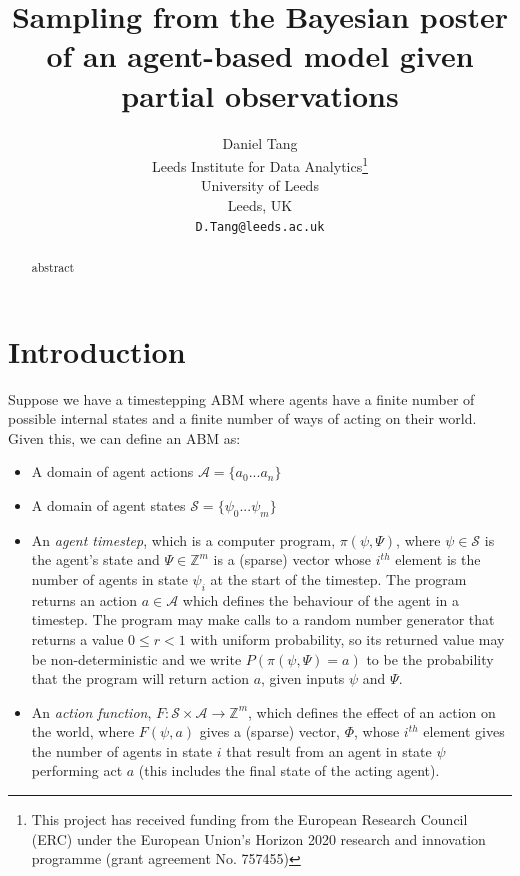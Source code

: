 \documentclass{article}
\title{Sampling from the Bayesian poster of an agent-based model given partial observations}
\author{
  Daniel Tang\\
  Leeds Institute for Data Analytics\thanks{This project has received funding from the European Research Council (ERC) under the European Union’s Horizon 2020 research and innovation programme (grant agreement No. 757455)}\\
  University of Leeds\\
  Leeds, UK\\
  \texttt{D.Tang@leeds.ac.uk} \\
}
\begin{document}
\maketitle

\begin{abstract}
abstract
\end{abstract}


\section{Introduction}


Suppose we have a timestepping ABM where agents have a finite number of possible internal states and a finite number of ways of acting on their world. Given this, we can define an ABM as:
\begin{itemize}
\item A domain of agent actions $\mathcal{A} =\{ a_0 ... a_n \}$

\item A domain of agent states $\mathcal{S} = \{\psi_0 ... \psi_m\}$

\item An \textit{agent timestep}, which is a computer program, $\pi(\psi,\Psi)$, where $\psi \in \mathcal{S}$ is the agent's state and $\Psi \in \mathbb{Z}^m$ is a (sparse) vector whose $i^{th}$ element is the number of agents in state $\psi_i$ at the start of the timestep. The program returns an action $a \in \mathcal{A}$ which defines the behaviour of the agent in a timestep. The program may make calls to a random number generator that returns a value $0 \le r < 1$ with uniform probability, so its returned value may be non-deterministic and we write $P(\pi(\psi,\Psi)=a)$ to be the probability that the program will return action $a$, given inputs $\psi$ and $\Psi$. 

\item An \textit{action function}, $F: \mathcal{S} \times \mathcal{A} \to \mathbb{Z}^m$, which defines the effect of an action on the world, where $F(\psi, a)$ gives a (sparse) vector, $\Phi$, whose $i^{th}$ element gives the number of agents in state $i$ that result from an agent in state $\psi$ performing act $a$ (this includes the final state of the acting agent).
\end{itemize}
\end{document}
